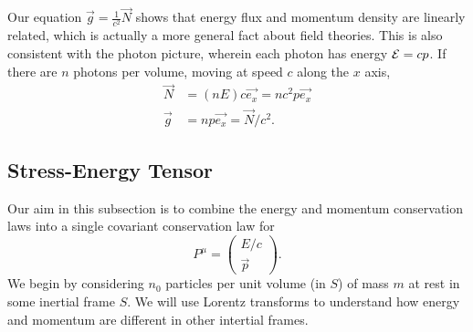\documentclass[../Main.tex]{subfiles}
\begin{document}
Our equation $\vec{g} = \frac1{c^2} \vec{N}$ shows that energy flux and momentum density are linearly related, which is actually a more general fact about field theories. This is also consistent with the photon picture, wherein each photon has energy $\mathcal{E} = cp$. If there are $n$ photons per volume, moving at speed $c$ along the $x$ axis,
\begin{align*}
    \vec{N} &= (nE) c \vec{e_x} = nc^2p\vec{e_x} \\
    \vec{g} &= n p \vec{e_x} = \vec{N} / c^2.
\end{align*}
\subsection{Stress-Energy Tensor}
\label{sscParticlesBoost}
Our aim in this subsection is to combine the energy and momentum conservation laws into a single covariant conservation law for
\begin{equation*}
    P^\mu = \begin{pmatrix}E / c \\ \vec{p}\end{pmatrix}.
\end{equation*}
We begin by considering $n_0$ particles per unit volume (in $S$) of mass $m$ at rest in some inertial frame $S$. We will use Lorentz transforms to understand how energy and momentum are different in other intertial frames.
\end{document}
